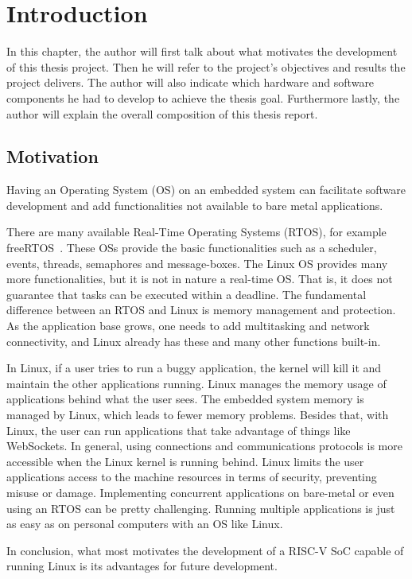 \chapter{Introduction}
\label{chapter:introduction}
In this chapter, the author will first talk about what motivates the development of this thesis project. Then he will refer to the project's objectives and results the project delivers. The author will also indicate which hardware and software components he had to develop to achieve the thesis goal. Furthermore lastly, the author will explain the overall composition of this thesis report.

\section{Motivation}
\label{section:motivation}
Having an Operating System (OS) on an embedded system can facilitate software development and add functionalities not available to bare metal applications. 

There are many available Real-Time Operating Systems (RTOS), for example freeRTOS~\cite{barry2008freertos}. These OSs provide the basic functionalities such as a scheduler, events, threads, semaphores and message-boxes. The Linux OS provides many more functionalities, but it is not in nature a real-time OS. That is, it does not guarantee that tasks can be executed within a deadline. The fundamental difference between an RTOS and Linux is memory management and protection. As the application base grows, one needs to add multitasking and network connectivity, and Linux already has these and many other functions built-in.

In Linux, if a user tries to run a buggy application, the kernel will kill it and maintain the other applications running. Linux manages the memory usage of applications behind what the user sees. The embedded system memory is managed by Linux, which leads to fewer memory problems. Besides that, with Linux, the user can run applications that take advantage of things like WebSockets. In general, using connections and communications protocols is more accessible when the Linux kernel is running behind. Linux limits the user applications access to the machine resources in terms of security, preventing misuse or damage. Implementing concurrent applications on bare-metal or even using an RTOS can be pretty challenging. Running multiple applications is just as easy as on personal computers with an OS like Linux.

In conclusion, what most motivates the development of a RISC-V SoC capable of running Linux is its advantages for future development.

